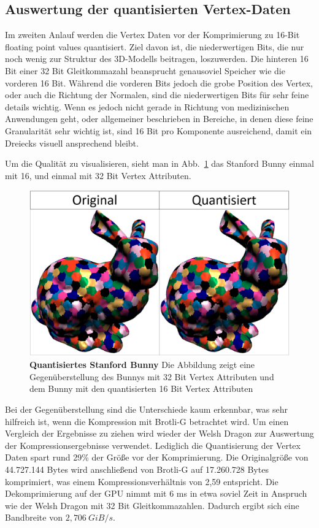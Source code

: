 \subsection{Auswertung der quantisierten Vertex-Daten}
\label{subsec:auswertung2}
Im zweiten Anlauf werden die Vertex Daten vor der Komprimierung zu 16-Bit floating point values quantisiert.
Ziel davon ist, die niederwertigen Bits, die nur noch wenig zur Struktur des 3D-Modells beitragen, loszuwerden.
Die hinteren 16 Bit einer 32 Bit Gleitkommazahl beansprucht genausoviel Speicher wie die vorderen 16 Bit.
Während die vorderen Bits jedoch die grobe Position des Vertex, oder auch die Richtung der Normalen, sind die niederwertigen Bits für sehr feine details wichtig.
Wenn es jedoch nicht gerade in Richtung von medizinischen Anwendungen geht, oder allgemeiner beschrieben in Bereiche, in denen diese feine Granularität sehr wichtig ist, sind 16 Bit pro Komponente ausreichend, damit ein Dreiecks visuell ansprechend bleibt. \newline

Um die Qualität zu visualisieren, sieht man in Abb.~\ref{fig:bunny} das Stanford Bunny einmal mit 16, und einmal mit 32 Bit Vertex Attributen.

\begin{figure}[htb]
  \centering  
  \includegraphics[scale=0.45]{Bilder/bunny_quantisiert.png}
  \caption[Quantisiertes Stanford Bunny]{\textbf{Quantisiertes Stanford Bunny} Die Abbildung zeigt eine Gegenüberstellung des Bunnys mit 32 Bit Vertex Attributen und dem Bunny mit den quantisierten 16 Bit Vertex Attributen }
  \label{fig:bunny}
\end{figure}

Bei der Gegenüberstellung sind die Unterschiede kaum erkennbar, was sehr hilfreich ist, wenn die Kompression mit Brotli-G betrachtet wird.
Um einen Vergleich der Ergebnisse zu ziehen wird wieder der Welsh Dragon zur Auswertung der Kompressionsergebnisse verwendet.
Lediglich die Quantisierung der Vertex Daten spart rund 29\% der Größe vor der Komprimierung.
Die Originalgröße von 44.727.144 Bytes wird anschließend von Brotli-G auf 17.260.728 Bytes komprimiert, was einem Kompressionsverhältnis von 2,59 entspricht.
Die Dekomprimierung auf der GPU nimmt mit 6 ms in etwa soviel Zeit in Anspruch wie der Welsh Dragon mit 32 Bit Gleitkommazahlen.
Dadurch ergibt sich eine Bandbreite von $\mathit{2,706 \ GiB/s}$. \newline

